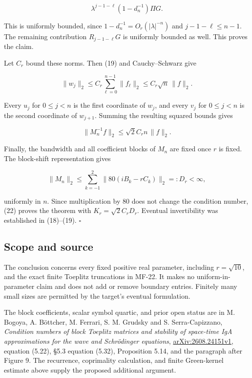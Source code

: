 \documentclass[10pt,a4paper]{article}
\begin{document}
\nopagebreak[4]

\[
\lambda^{j-1-\ell}(1-d_n^{-1})\Pi G.
\]

This is uniformly bounded, since \(1-d_n^{-1}=O_r(|\lambda|^{-n})\) and
\(j-1-\ell\le n-1\). The remaining contribution \(R_{j-1-\ell}G\) is
uniformly bounded as well. This proves the claim.

Let \(C_r\) bound these norms. Then (19) and Cauchy--Schwarz give

\nopagebreak[4]

\[
\|w_j\|_2\le C_r\sum_{\ell=0}^{n-1}\|f_\ell\|_2
\le C_r\sqrt n\,\|f\|_2.
\]

Every \(u_j\) for \(0\le j<n\) is the first coordinate of \(w_j\), and
every \(v_j\) for \(0\le j<n\) is the second coordinate of \(w_{j+1}\).
Summing the resulting squared bounds gives

\nopagebreak[4]

\[
\|M_n^{-1}f\|_2\le \sqrt2 C_r n\,\|f\|_2.
\tag{22}
\]

Finally, the bandwidth and all coefficient blocks of \(M_n\) are fixed
once \(r\) is fixed. The block-shift representation gives

\nopagebreak[4]

\[
\|M_n\|_2\le\sum_{k=-1}^{2}\|80(iB_k-rC_k)\|_2=:D_r<\infty,
\]

uniformly in \(n\). Since multiplication by \(80\) does not change the
condition number, (22) proves the theorem with \(K_r=\sqrt2 C_rD_r\).
Eventual invertibility was established in (18)--(19). \(\square\)


\subsection{Scope and source}\label{scope-and-source}

The conclusion concerns every fixed positive real parameter, including
\(r=\sqrt{10}\), and the exact finite Toeplitz truncations in MF-22. It
makes no uniform-in-parameter claim and does not add or remove boundary
entries. Finitely many small sizes are permitted by the target's
eventual formulation.

The block coefficients, scalar symbol quartic, and prior open status are
in M. Bogoya, A. Böttcher, M. Ferrari, S. M. Grudsky and S.
Serra-Capizzano, \emph{Condition numbers of block Toeplitz matrices and
stability of space-time IgA approximations for the wave and Schrödinger
equations},
\href{https://arxiv.org/html/2608.24151v1}{arXiv:2608.24151v1}, equation
(5.22), §5.3 equation (5.32), Proposition 5.14, and the paragraph after
Figure 9. The recurrence, coprimality calculation, and finite
Green-kernel estimate above supply the proposed additional argument.
\end{document}
